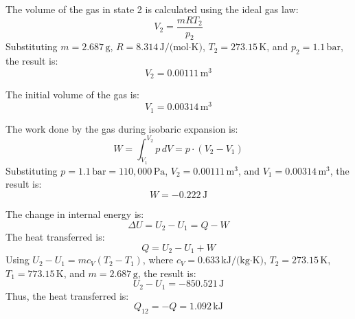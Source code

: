 The volume of the gas in state 2 is calculated using the ideal gas law:  
\[
V_2 = \frac{m R T_2}{p_2}
\]  
Substituting \( m = 2.687 \, \text{g} \), \( R = 8.314 \, \text{J/(mol·K)} \), \( T_2 = 273.15 \, \text{K} \), and \( p_2 = 1.1 \, \text{bar} \), the result is:  
\[
V_2 = 0.00111 \, \text{m}^3
\]  

The initial volume of the gas is:  
\[
V_1 = 0.00314 \, \text{m}^3
\]  

The work done by the gas during isobaric expansion is:  
\[
W = \int_{V_1}^{V_2} p \, dV = p \cdot (V_2 - V_1)
\]  
Substituting \( p = 1.1 \, \text{bar} = 110,000 \, \text{Pa} \), \( V_2 = 0.00111 \, \text{m}^3 \), and \( V_1 = 0.00314 \, \text{m}^3 \), the result is:  
\[
W = -0.222 \, \text{J}
\]  

The change in internal energy is:  
\[
\Delta U = U_2 - U_1 = Q - W
\]  
The heat transferred is:  
\[
Q = U_2 - U_1 + W
\]  
Using \( U_2 - U_1 = m c_V (T_2 - T_1) \), where \( c_V = 0.633 \, \text{kJ/(kg·K)} \), \( T_2 = 273.15 \, \text{K} \), \( T_1 = 773.15 \, \text{K} \), and \( m = 2.687 \, \text{g} \), the result is:  
\[
U_2 - U_1 = -850.521 \, \text{J}
\]  
Thus, the heat transferred is:  
\[
Q_{12} = -Q = 1.092 \, \text{kJ}
\]